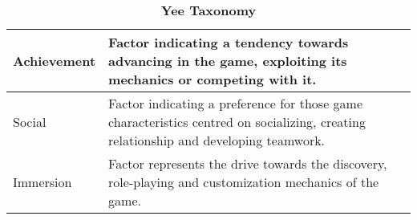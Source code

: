 \begin{table}[h]
\caption{\textbf{Yee Taxonomy}}
\label{yee}
\begin{tabularx}{\textwidth}{|l|X|}
\hline
Achievement & Factor indicating a tendency towards advancing in the game, exploiting its mechanics or competing with it.                           \\ \hline
Social      & Factor indicating a preference for those game characteristics centred on socializing, creating relationship and developing teamwork. \\ \hline
Immersion   & Factor  represents the drive towards the discovery, role-playing and customization mechanics of the game.                            \\ \hline
\end{tabularx}
\end{table}